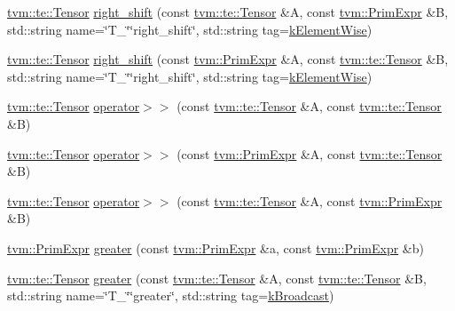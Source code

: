 \begin{DoxyCompactItemize}
\item 
\hyperlink{classtvm_1_1te_1_1Tensor}{tvm\+::te\+::\+Tensor} \hyperlink{namespacetopi_a7d451c0ffc35dbe717f09342948853af}{right\+\_\+shift} (const \hyperlink{classtvm_1_1te_1_1Tensor}{tvm\+::te\+::\+Tensor} \&A, const \hyperlink{classtvm_1_1PrimExpr}{tvm\+::\+Prim\+Expr} \&B, std\+::string name=\char`\"{}T\+\_\+\char`\"{}\char`\"{}right\+\_\+shift\char`\"{}, std\+::string tag=\hyperlink{namespacetopi_ac1b34ed59d38a5f5338bee6b2cad42be}{k\+Element\+Wise})
\item 
\hyperlink{classtvm_1_1te_1_1Tensor}{tvm\+::te\+::\+Tensor} \hyperlink{namespacetopi_ae7574a7a362e9ee9e4f0b5a2de12e908}{right\+\_\+shift} (const \hyperlink{classtvm_1_1PrimExpr}{tvm\+::\+Prim\+Expr} \&A, const \hyperlink{classtvm_1_1te_1_1Tensor}{tvm\+::te\+::\+Tensor} \&B, std\+::string name=\char`\"{}T\+\_\+\char`\"{}\char`\"{}right\+\_\+shift\char`\"{}, std\+::string tag=\hyperlink{namespacetopi_ac1b34ed59d38a5f5338bee6b2cad42be}{k\+Element\+Wise})
\item 
\hyperlink{classtvm_1_1te_1_1Tensor}{tvm\+::te\+::\+Tensor} \hyperlink{namespacetopi_a6d217675be3a42053c57aae4f65a299b}{operator$>$$>$} (const \hyperlink{classtvm_1_1te_1_1Tensor}{tvm\+::te\+::\+Tensor} \&A, const \hyperlink{classtvm_1_1te_1_1Tensor}{tvm\+::te\+::\+Tensor} \&B)
\item 
\hyperlink{classtvm_1_1te_1_1Tensor}{tvm\+::te\+::\+Tensor} \hyperlink{namespacetopi_aca0b19963be41f5643ecc0a8038a79f8}{operator$>$$>$} (const \hyperlink{classtvm_1_1PrimExpr}{tvm\+::\+Prim\+Expr} \&A, const \hyperlink{classtvm_1_1te_1_1Tensor}{tvm\+::te\+::\+Tensor} \&B)
\item 
\hyperlink{classtvm_1_1te_1_1Tensor}{tvm\+::te\+::\+Tensor} \hyperlink{namespacetopi_a276bae55f5c7dbf86196488820ef88bf}{operator$>$$>$} (const \hyperlink{classtvm_1_1te_1_1Tensor}{tvm\+::te\+::\+Tensor} \&A, const \hyperlink{classtvm_1_1PrimExpr}{tvm\+::\+Prim\+Expr} \&B)
\item 
\hyperlink{classtvm_1_1PrimExpr}{tvm\+::\+Prim\+Expr} \hyperlink{namespacetopi_a9bdc92081dabc451c196060d72aab223}{greater} (const \hyperlink{classtvm_1_1PrimExpr}{tvm\+::\+Prim\+Expr} \&a, const \hyperlink{classtvm_1_1PrimExpr}{tvm\+::\+Prim\+Expr} \&b)
\item 
\hyperlink{classtvm_1_1te_1_1Tensor}{tvm\+::te\+::\+Tensor} \hyperlink{namespacetopi_a3a979d52d34e06216e681214d1131ab8}{greater} (const \hyperlink{classtvm_1_1te_1_1Tensor}{tvm\+::te\+::\+Tensor} \&A, const \hyperlink{classtvm_1_1te_1_1Tensor}{tvm\+::te\+::\+Tensor} \&B, std\+::string name=\char`\"{}T\+\_\+\char`\"{}\char`\"{}greater\char`\"{}, std\+::string tag=\hyperlink{namespacetopi_a794b9155e9ba9d1c9c42a1cff1fb645f}{k\+Broadcast})

\end{DoxyCompactItemize}

